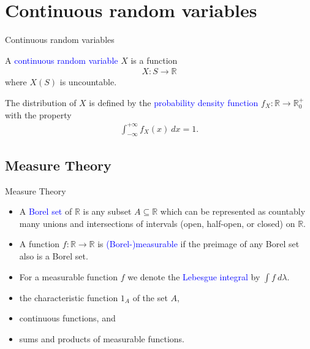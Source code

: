 \documentclass{beamer}
\def\spadding{\vspace{0.25cm}}
\def\b{\textcolor{blue}}
\begin{document}
\section{Continuous random variables}
\begin{frame}{Continuous random variables}
    \begin{definition}
        A \b{continuous random variable} $X$ is a function
        \begin{align*}
            X: S \to \mathbb{R}
        \end{align*}
        where $X(S)$ is uncountable.\pause\par\spadding
        The distribution of $X$ is defined by the \b{probability density function} $f_X: \mathbb{R} \to \mathbb{R}_0^+$ with the property
        \begin{align*}
            \int_{- \infty}^{+ \infty} f_X(x)\ dx = 1.
        \end{align*}
    \end{definition}
\end{frame}

\subsection{Measure Theory}
\begin{frame}{Measure Theory}
    \begin{definition}
        \begin{itemize}
            \item A \b{Borel set} of $\mathbb{R}$ is any subset $A \subseteq \mathbb{R}$ which can be represented as countably many unions and intersections of intervals (open, half-open, or closed) on $\mathbb{R}$.\pause
            \item A function $f : \mathbb{R} \to \mathbb{R}$ is \b{(Borel-)measurable} if the preimage of any Borel set also is a Borel set.\pause
            \item For a measurable function $f$ we denote the \b{Lebesgue integral} by $\int f\ d\lambda$.
        \end{itemize}
    \end{definition}\pause
    \begin{example}
        \begin{itemize}
            \item the characteristic function $1_A$ of the set $A$,
            \item continuous functions, and
            \item sums and products of measurable functions.
        \end{itemize}
    \end{example}
\end{frame}
\end{document}
